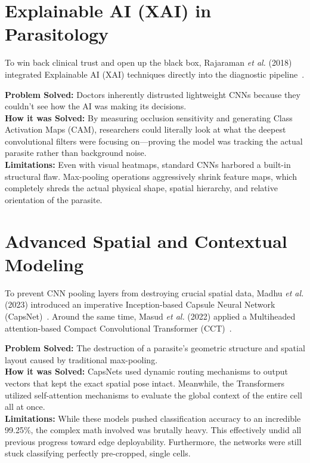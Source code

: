 \documentclass[conference]{IEEEtran}
\begin{document}
\section{Explainable AI (XAI) in Parasitology}
To win back clinical trust and open up the black box, Rajaraman \emph{et al.} (2018)
integrated Explainable AI (XAI) techniques directly into the diagnostic
pipeline~\cite{rajaraman2018xai}.

\textbf{Problem Solved:} Doctors inherently distrusted lightweight CNNs because they
couldn't see how the AI was making its decisions.\\
\textbf{How it was Solved:} By measuring occlusion sensitivity and generating Class
Activation Maps (CAM), researchers could literally look at what the deepest
convolutional filters were focusing on---proving the model was tracking the actual
parasite rather than background noise.\\
\textbf{Limitations:} Even with visual heatmaps, standard CNNs harbored a built-in
structural flaw. Max-pooling operations aggressively shrink feature maps, which
completely shreds the actual physical shape, spatial hierarchy, and relative
orientation of the parasite.

\section{Advanced Spatial and Contextual Modeling}
To prevent CNN pooling layers from destroying crucial spatial data, Madhu \emph{et
al.} (2023) introduced an imperative Inception-based Capsule Neural Network
(CapsNet)~\cite{madhu2023}. Around the same time, Masud \emph{et al.} (2022) applied a
Multiheaded attention-based Compact Convolutional Transformer (CCT)~\cite{masud2022}.

\textbf{Problem Solved:} The destruction of a parasite's geometric structure and
spatial layout caused by traditional max-pooling.\\
\textbf{How it was Solved:} CapsNets used dynamic routing mechanisms to output vectors
that kept the exact spatial pose intact. Meanwhile, the Transformers utilized
self-attention mechanisms to evaluate the global context of the entire cell all at
once.\\
\textbf{Limitations:} While these models pushed classification accuracy to an
incredible 99.25\%, the complex math involved was brutally heavy. This effectively
undid all previous progress toward edge deployability. Furthermore, the networks were
still stuck classifying perfectly pre-cropped, single cells.
\end{document}
